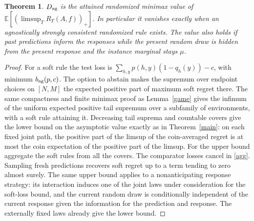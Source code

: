 \documentclass[11pt]{article}
\newtheorem{theorem}{Theorem}
\newcommand{\E}{\mathbb E}
\begin{document}
\begin{theorem}
$D_{\rm ag}$ is the attained randomized minimax value of $\E[(\limsup_T R_T(A,f))_+]$. In particular it vanishes exactly when an agnostically strongly consistent randomized rule exists. The value also holds if past predictions inform the responses while the present random draw is hidden from the present response and the instance marginal stays $\mu$.
\end{theorem}
\begin{proof}
For a soft rule the test loss is $\sum_{h,y} p(h,y)(1-q_h(y))-c$, with minimum $b_{\rm ag}(p,c)$. The option to abstain makes the supremum over endpoint choices on $[N,M]$ the expected positive part of maximum soft regret there. The same compactness and finite minimax proof as Lemma~\ref{game} gives the infimum of the uniform expected positive tail supremum over a subfamily of environments, with a soft rule attaining it. Decreasing tail suprema and countable covers give the lower bound on the asymptotic value exactly as in Theorem~\ref{main}: on each fixed joint path, the positive part of the limsup of the coin-averaged regret is at most the coin expectation of the positive part of the limsup. For the upper bound aggregate the soft rules from all the covers. The comparator losses cancel in \eqref{agg}. Sampling fresh predictions recovers soft regret up to a term tending to zero almost surely. The same upper bound applies to a nonanticipating response strategy: its interaction induces one of the joint laws under consideration for the soft-loss bound, and the current random draw is conditionally independent of the current response given the information for the prediction and response. The externally fixed laws already give the lower bound.
\end{proof}
\end{document}
